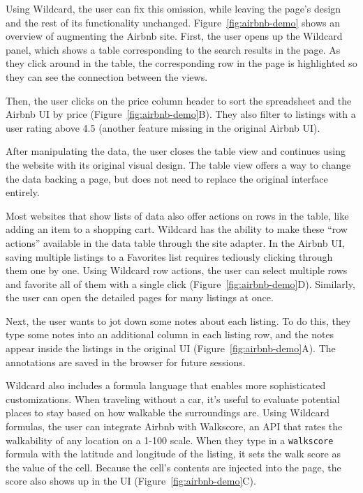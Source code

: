 \documentclass[english,submission]{programming}
\begin{document}
Using Wildcard, the user can fix this omission, while leaving the page's
design and the rest of its functionality unchanged.{
Figure~\ref{fig:airbnb-demo} shows an overview of augmenting the Airbnb
site.} First, the user opens up the Wildcard panel, which shows a table
corresponding to the search results in the page. As they click around in
the table, the corresponding row in the page is highlighted so they can
see the connection between the views.

Then, the user clicks on the price column header to sort the spreadsheet
and the Airbnb UI by price{ (Figure~\ref{fig:airbnb-demo}B)}. They also
filter to listings with a user rating above 4.5 (another feature missing
in the original Airbnb UI).

After manipulating the data, the user closes the table view and
continues using the website with its original visual design. The table
view offers a way to change the data backing a page, but does not need
to replace the original interface entirely.

Most websites that show lists of data also offer actions on rows in the
table, like adding an item to a shopping cart. Wildcard has the ability
to make these ``row actions'' available in the data table through the
site adapter. In the Airbnb UI, saving multiple listings to a Favorites
list requires tediously clicking through them one by one. Using Wildcard
row actions, the user can select multiple rows and favorite all of them
with a single click{ (Figure~\ref{fig:airbnb-demo}D)}. Similarly, the
user can open the detailed pages for many listings at once.

Next, the user wants to jot down some notes about each listing. To do
this, they type some notes into an additional column in each listing
row, and the notes appear inside the listings in the original UI{
(Figure~\ref{fig:airbnb-demo}A)}. The annotations are saved in the
browser for future sessions.

Wildcard also includes a formula language that enables more
sophisticated customizations. When traveling without a car, it's useful
to evaluate potential places to stay based on how walkable the
surroundings are. Using Wildcard formulas, the user can integrate Airbnb
with Walkscore, an API that rates the walkability of any location on a
1-100 scale. When they type in a \texttt{walkscore} formula with the
latitude and longitude of the listing, it sets the walk score as the
value of the cell. Because the cell's contents are injected into the
page, the score also shows up in the UI{
(Figure~\ref{fig:airbnb-demo}C)}.
\end{document}
